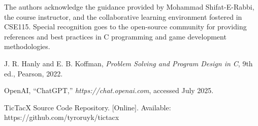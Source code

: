 \documentclass[11pt,a4paper,twocolumn]{article}
\begin{document}
The authors acknowledge the guidance provided by Mohammad Shifat-E-Rabbi, the course instructor, and the collaborative learning environment fostered in CSE115. Special recognition goes to the open-source community for providing references and best practices in C programming and game development methodologies.

\begin{thebibliography}{9}

J. R. Hanly and E. B. Koffman, \textit{Problem Solving and Program Design in C}, 9th ed., Pearson, 2022.

OpenAI, ``ChatGPT,'' \textit{https://chat.openai.com}, accessed July 2025.

TicTacX Source Code Repository. [Online]. Available: https://github.com/tyroruyk/tictacx

\end{thebibliography}
\end{document}
